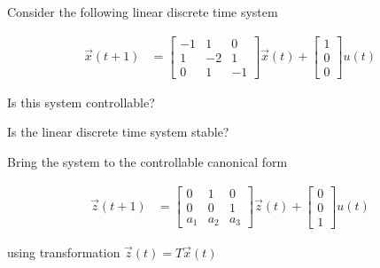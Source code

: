 
Consider the following linear discrete time system

\begin{align*}
\vec{x}(t+1) &= \begin{bmatrix}
-1 &  1 &  0 \\
 1 & -2 &  1 \\
 0 &  1 & -1
\end{bmatrix}
\vec{x}(t) +
\begin{bmatrix}
1 \\ 0 \\ 0
\end{bmatrix} u(t)
\end{align*}

\begin{enumerate}

\qitem Is this system controllable?


\qitem Is the linear discrete time system stable?



\qitem Bring the system to the controllable canonical form

\begin{align*}
\vec{z}(t+1) &= \begin{bmatrix}
0 & 1 & 0 \\
0 & 0 & 1 \\
a_1 & a_2 & a_3
\end{bmatrix}
\vec{z}(t) +
\begin{bmatrix}
0 \\ 0 \\ 1
\end{bmatrix} u(t)
\end{align*}

using transformation $\vec{z}(t) = T\vec{x}(t)$


\end{enumerate}
